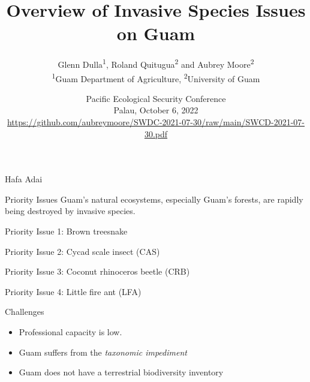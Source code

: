 \documentclass[]{beamer}
\title[Invasive Species Issues on Guam]{Overview of Invasive Species Issues on Guam}
\author[]{
	Glenn Dulla\textsuperscript{1}, Roland Quitugua\textsuperscript{2} and Aubrey Moore\textsuperscript{2}\\
	\bigskip 
	\textsuperscript{1}Guam Department of Agriculture,
    \textsuperscript{2}University of Guam
}
\date[]{Pacific Ecological Security Conference\\Palau, October 6, 2022\\ \tiny\url{https://github.com/aubreymoore/SWDC-2021-07-30/raw/main/SWCD-2021-07-30.pdf}}
\begin{document}
	
    \maketitle

\begin{frame}{Hafa Adai}
\end{frame}

\begin{frame}{Priority Issues}
	Guam's natural ecosystems, especially Guam's forests, are rapidly being destroyed by invasive species.
	
	
\end{frame}


\begin{frame}{Priority Issue 1: Brown treesnake}
\end{frame}


\begin{frame}{Priority Issue 2: Cycad scale insect (CAS)}
\end{frame}


\begin{frame}{Priority Issue 3: Coconut rhinoceros beetle (CRB)}
\end{frame}

\begin{frame}{Priority Issue 4: Little fire ant (LFA)}
\end{frame}

\begin{frame}{Challenges}
	\begin{itemize}
		\item Professional capacity is low.
		\item Guam suffers from the \textit{taxonomic impediment}
		\item Guam does not have a terrestrial biodiversity inventory
	\end{itemize}
\end{frame}
\end{document}
